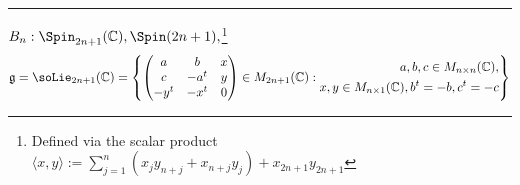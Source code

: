 \documentclass[reqno]{amsart} 
\begin{document}
\hrule


$B_{n}: \Spin_{2n+1}(\mathbb{C}), \Spin(2n+1),$\footnote{ Defined via the scalar product $\langle x,y \rangle := \sum_{j=1}^n (x_j y_{n+j} + x_{n+j} y_j) + x_{2 n+1} y_{2n+1}$ }
\begin{equation*}
  \mathfrak{g} = \soLie_{2n+1}(\mathbb{C}) = \left\{ 
\begin{pmatrix}
    a & b  & x \\
    c & -a^t & y \\
    -y^t & - x^t & 0
  \end{pmatrix}
 \in M_{2n+1}(\mathbb{C}) :
  \begin{split}
    a,b,c \in M_{n \times n}(\mathbb{C}),
    \\
    x,y \in M_{n \times 1}(\mathbb{C}),
    b^t = -b, c^t = -c
  \end{split}
\right\}
\end{equation*}
\end{document}
